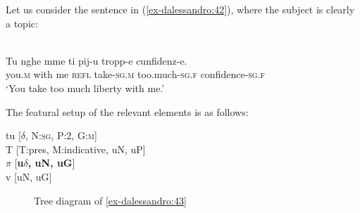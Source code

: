 \documentclass[output=paper
,modfonts
,nonflat]{langsci/langscibook}
\begin{document}
Let us consider the sentence in (\ref{ex-dalessandro:42}), where the subject is clearly a topic:

\begin{exe}
	\ex\label{ex-dalessandro:42}\citet[86]{Rossi2008}\\
	\gll Tu   nghe mme   ti   pij-u     tropp-e   cunfidenz-e.\\
	you.\textsc{m}  with me  \textsc{refl} take-\textsc{sg.m} too.much-\textsc{sg.f} confidence-\textsc{sg.f}\\
	\glt `You take too much liberty with me.'
\end{exe}
The featural setup of the relevant elements is as follows:

\begin{exe}
\ex \label{ex-dalessandro:43}
tu [\textbf{$\delta$}, N:\textsc{sg}, P:2, G:\textsc{m}]\\
T [T:pres, M:indicative, uN, uP]\\
$\pi $ [\textbf{u}\textbf{$\delta$}\textbf{, uN, uG}]\\
v  [uN, uG]
\end{exe}


	\begin{figure}
		\caption{Tree diagram of \ref{ex-dalessandro:43}}\label{ex-dalessandro:44}
	\end{figure}
	
\end{document}
